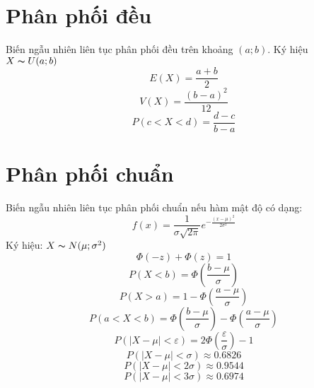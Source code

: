 \documentclass[utf8,a4paper]{article}
\begin{document}
\section[]{Phân phối đều}
Biến ngẫu nhiên liên tục phân phối đều trên khoảng \((a;b)\). Ký hiệu \(X \thicksim U(a;b)\)
\[E(X) = \frac{a + b}{2}\] 
\[V(X) = \frac{{(b - a)^{2}}}{12}\] 
\[P(c < X < d) = \frac{d - c}{b - a}\]

\section[]{Phân phối chuẩn}
Biến ngẫu nhiên liên tục phân phối chuẩn nếu hàm mật độ có dạng: 
\[f(x) = \frac{1}{\sigma \sqrt{2 \pi}} {e}^{-\frac{{(x - \mu)}^{2}}{2 {\sigma}^{2}}}\]
Ký hiệu: \(X \thicksim N(\mu ; {\sigma}^{2})\)
\[\Phi \left(-z\right) + \Phi \left(z\right) = 1\]
\[P(X < b) = \Phi \left(\frac{b - \mu}{\sigma}\right)\]
\[P(X > a) = 1 - \Phi \left(\frac{a - \mu}{\sigma}\right)\]
\[P(a < X < b) = \Phi \left( \frac{b - \mu}{\sigma} \right) - \Phi \left( \frac{a - \mu}{\sigma} \right)\]
\[P(|X - \mu| < \varepsilon) = 2 \Phi \left( \frac{\varepsilon}{\sigma}\right) - 1\]
\[P(|X - \mu| < \sigma) \approx 0.6826\]
\[P(|X - \mu| < 2\sigma) \approx 0.9544\]
\[P(|X - \mu| < 3\sigma) \approx 0.6974\]
\end{document}
